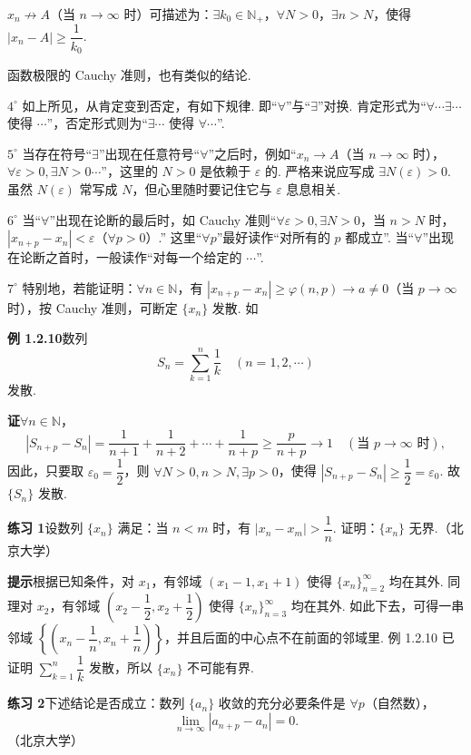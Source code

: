 \documentclass[UTF8, 12pt, fontset=fandol, oneside]{ctexart}
\begin{document}
$x_n\not\to A$（当 $n\to\infty$ 时）可描述为：$\exists k_0\in\mathbb{N}_+$，$\forall N>0$，$\exists n>N$，使得 $|x_n-A|\ge\dfrac1{k_0}$.

函数极限的 Cauchy 准则，也有类似的结论.

$4^\circ$ 如上所见，从肯定变到否定，有如下规律. 即“$\forall$”与“$\exists$”对换. 肯定形式为“$\forall\cdots\exists\cdots$ 使得 $\cdots$”，否定形式则为“$\exists\cdots$ 使得 $\forall\cdots$”.

$5^\circ$ 当存在符号“$\exists$”出现在任意符号“$\forall$”之后时，例如“$x_n\to A$（当 $n\to\infty$ 时），$\forall\varepsilon>0,\exists N>0\cdots$”，这里的 $N>0$ 是依赖于 $\varepsilon$ 的. 严格来说应写成 $\exists N(\varepsilon)>0$. 虽然 $N(\varepsilon)$ 常写成 $N$，但心里随时要记住它与 $\varepsilon$ 息息相关.

$6^\circ$ 当“$\forall$”出现在论断的最后时，如 Cauchy 准则“$\forall\varepsilon>0,\exists N>0$，当 $n>N$ 时，$|x_{n+p}-x_n|<\varepsilon$（$\forall p>0$）.” 这里“$\forall p$”最好读作“对所有的 $p$ 都成立”. 当“$\forall$”出现在论断之首时，一般读作“对每一个给定的 $\cdots$”.

$7^\circ$ 特别地，若能证明：$\forall n\in\mathbb{N}$，有 $|x_{n+p}-x_n|\ge\varphi(n,p)\to a\ne0$（当 $p\to\infty$ 时），按 Cauchy 准则，可断定 $\{x_n\}$ 发散. 如

\noindent\textbf{例 1.2.10}\quad 数列
\[
  S_n=\sum_{k=1}^n\frac1k\quad(n=1,2,\cdots)
\]
发散.

\noindent\textbf{证}\quad $\forall n\in\mathbb{N}$，
\[
  |S_{n+p}-S_n|=\frac1{n+1}+\frac1{n+2}+\cdots+\frac1{n+p}
  \ge \frac{p}{n+p}\to1\quad(\text{当 }p\to\infty\text{ 时}),
\]
因此，只要取 $\varepsilon_0=\dfrac12$，则 $\forall N>0,n>N,\exists p>0$，使得 $|S_{n+p}-S_n|\ge\dfrac12=\varepsilon_0$. 故 $\{S_n\}$ 发散.

\noindent\textbf{练习 1}\quad 设数列 $\{x_n\}$ 满足：当 $n<m$ 时，有 $|x_n-x_m|>\dfrac1n$. 证明：$\{x_n\}$ 无界.（北京大学）

\noindent\textbf{提示}\quad 根据已知条件，对 $x_1$，有邻域 $(x_1-1,x_1+1)$ 使得 $\{x_n\}_{n=2}^\infty$ 均在其外. 同理对 $x_2$，有邻域 $\left(x_2-\dfrac12,x_2+\dfrac12\right)$ 使得 $\{x_n\}_{n=3}^\infty$ 均在其外. 如此下去，可得一串邻域 $\left\{\left(x_n-\dfrac1n,x_n+\dfrac1n\right)\right\}$，并且后面的中心点不在前面的邻域里. 例 1.2.10 已证明 $\sum\limits_{k=1}^n\dfrac1k$ 发散，所以 $\{x_n\}$ 不可能有界.

\noindent\textbf{练习 2}\quad 下述结论是否成立：数列 $\{a_n\}$ 收敛的充分必要条件是 $\forall p$（自然数），
\[
  \lim_{n\to\infty}|a_{n+p}-a_n|=0.
\tag{1}
\]
（北京大学）
\end{document}
